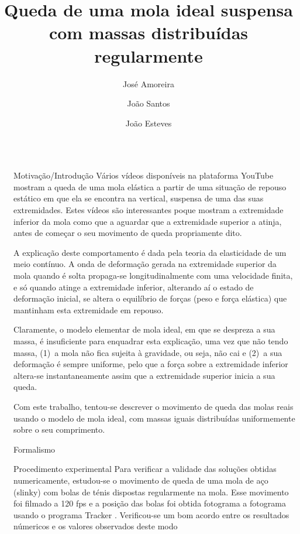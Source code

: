 \documentclass[final]{beamer}
\title{Queda de uma mola ideal suspensa com massas distribuídas regularmente}
\author{José Amoreira \inst{1,2,3} \and João Santos \inst{2} \and João Esteves \inst{2}}
\institute[]{\inst{1} Laboratório de Instrumentação e Física Experimental de Partículas \and  \inst{2}Universidade da Beira Interior  \samelineand \inst{3} Centro de Matemática e Aplicações}
\newlength{\sepwidth}
\newlength{\colwidth}
\newcommand{\separatorcolumn}{\begin{column}{\sepwidth}\end{column}}
\begin{document}
\begin{frame}[t]
\begin{columns}[t]
\separatorcolumn

\begin{column}{\colwidth}

  \begin{exampleblock}{Motivação/Introdução}
Vários vídeos disponíveis na plataforma YouTube mostram a queda de uma mola
elástica a partir de uma situação de repouso estático em que ela se encontra na
vertical, suspensa de uma das suas extremidades. Estes vídeos são interessantes
poque mostram a extremidade inferior da mola como que a aguardar que a
extremidade superior a atinja, antes de começar o seu movimento de queda
propriamente dito. 

A explicação deste comportamento é dada pela teoria da elasticidade de um meio
contínuo. A onda de deformação gerada na extremidade superior da mola quando é
solta propaga-se longitudinalmente com uma velocidade finita, e só quando atinge
a extremidade inferior, alterando aí o estado de deformação inicial, se altera o
equilíbrio de forças (peso e força elástica) que mantinham esta extremidade em
repouso.

Claramente, o modelo elementar de mola ideal, em que se despreza a sua massa, é
insuficiente para enquadrar esta explicação, uma vez que não tendo massa, (1)~a
mola não fica sujeita à gravidade, ou seja, não cai e (2)~a sua deformação é
sempre uniforme, pelo que a força sobre a extremidade inferior altera-se
instantaneamente assim que a extremidade superior inicia a sua queda. 

Com este trabalho, tentou-se descrever o movimento de queda das molas reais
usando o modelo de mola ideal, com massas iguais distribuídas uniformemente
sobre o seu comprimento.
  \end{exampleblock}
  

\begin{block}{Formalismo}
\vspace{1cm}

\end{block}

\begin{block}{Procedimento experimental}
Para verificar a validade das soluções obtidas numericamente, estudou-se o movimento de queda de uma mola de aço (slinky) com bolas de ténis dispostas regularmente na mola. Esse movimento foi filmado a 120 fps e a posição das bolas foi obtida fotograma a fotograma usando o programa Tracker \cite{Tracker}. Verificou-se um bom acordo entre os resultados númericos e os valores observados deste modo 



\end{block}
\end{column}
\end{columns}
\end{frame}
\end{document}
